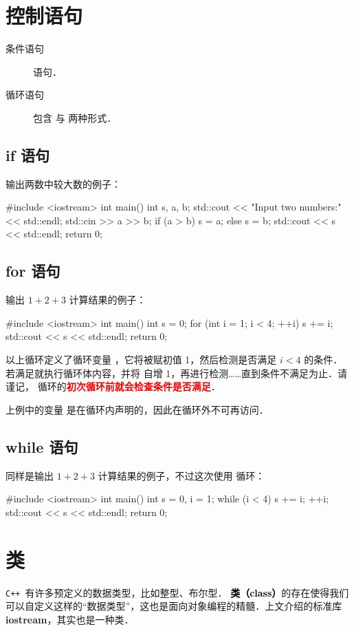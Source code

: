 \documentclass[a4paper, zihao=-4, linespread=1]{ctexrep}
\newcommand\cpp{\texttt{C++}}
\newcommand\cpplib[1]{\textcolor{red!80!black}{\bfseries #1}}
\newcommand\hlt[1]{\textcolor{red}{\bfseries #1}}
\newcommand\cppkw[1]{\textcolor{black}{\bfseries #1}}
\begin{document}
\section{控制语句}
\begin{description}
\item[条件语句]  语句．
\item[循环语句] 包含  与  两种形式．
\end{description}

\subsection{if 语句}
输出两数中较大数的例子：
\begin{cpplang}
#include <iostream>
int main() {
    int s, a, b;
    std::cout << "Input two numbers:" << std::endl;
    std::cin >> a >> b;
    if (a > b) {
        s = a;
    } else {
        s = b;
    }
    std::cout << s << std::endl;
    return 0;
}
\end{cpplang}

\subsection{for 语句}
输出 $1+2+3$ 计算结果的例子：
\begin{cpplang}
#include <iostream>
int main() {
    int s = 0;
    for (int i = 1; i < 4; ++i) {
        s += i;
    }
    std::cout << s << std::endl;
    return 0;
}
\end{cpplang}
以上循环定义了循环变量 ，它将被赋初值 1，然后检测是否满足 $i<4$ 的条件．若满足就执行循环体内容，并将  自增 1，再进行检测……直到条件不满足为止．请谨记， 循环的\hlt{初次循环前就会检查条件是否满足}．

上例中的变量  是在循环内声明的，因此在循环外不可再访问．

\subsection{while 语句}
同样是输出 $1+2+3$ 计算结果的例子，不过这次使用  循环：
\begin{cpplang}
#include <iostream>
int main() {
    int s = 0, i = 1;
    while (i < 4) {
        s += i;
        ++i;
    }
    std::cout << s << std::endl;
    return 0;
}
\end{cpplang}

\section{类}
\cpp\ 有许多预定义的数据类型，比如整型、布尔型． \cppkw{类（class）}的存在使得我们可以自定义这样的“数据类型”，这也是面向对象编程的精髓．上文介绍的标准库 \cpplib{iostream}，其实也是一种类．
\end{document}
